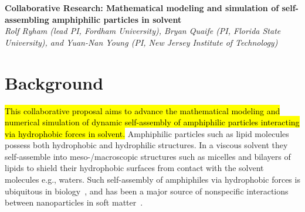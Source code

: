 \noindent
{\bf Collaborative Research: Mathematical modeling and simulation of
self-assembling amphiphilic particles in solvent} \\
{\em Rolf Ryham (lead PI, Fordham University),
Bryan Quaife (PI, Florida State University), and
Yuan-Nan Young (PI, New Jersey Institute of Technology)}

\section{Background}
\label{sec:background}
\hl{This collaborative proposal aims to advance
the mathematical modeling and numerical simulation
of dynamic self-assembly of amphiphilic particles interacting
via hydrophobic forces in solvent.}
Amphiphilic particles such as lipid molecules possess both hydrophobic
and hydrophilic structures. In a viscous solvent they self-assemble into
meso-/macroscopic structures such as micelles and bilayers of lipids to
shield their hydrophobic surfaces from contact with the solvent
molecules e.g., waters. Such self-assembly of amphiphiles via hydrophobic
forces is ubiquitous in biology~\cite{Israelachvili1954},
and has been a major source of nonspecific interactions between
nanoparticles in soft matter~\cite{Sanchez-IglesiasEtAl2012_ACSNano,
AltantzisEtAl2013_PSC, XieYangLuEtAl2020_COCIS}. 


